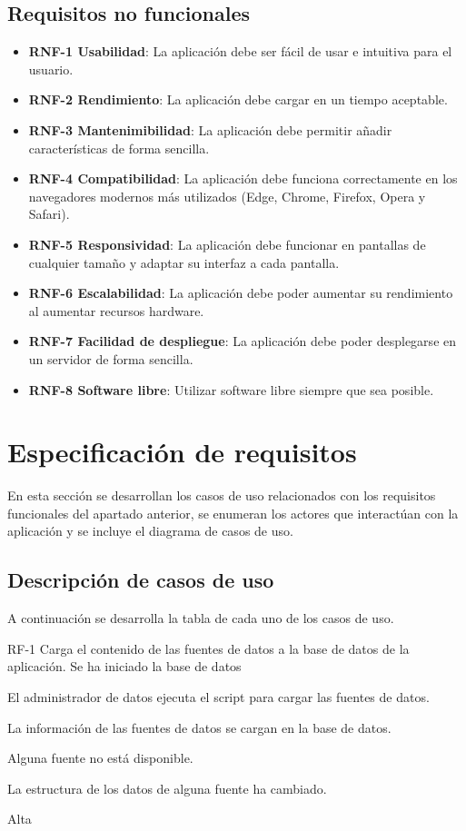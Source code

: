 \subsection{Requisitos no funcionales}

\begin{itemize}
	\item \textbf{RNF-1 Usabilidad}: La aplicación debe ser fácil de usar e intuitiva para el usuario.
	\item \textbf{RNF-2 Rendimiento}: La aplicación debe cargar en un tiempo aceptable.
	\item \textbf{RNF-3 Mantenimibilidad}: La aplicación debe permitir añadir características de forma sencilla.
	\item \textbf{RNF-4 Compatibilidad}: La aplicación debe funciona correctamente en los navegadores modernos más utilizados (Edge, Chrome, Firefox, Opera y Safari).
	\item \textbf{RNF-5 Responsividad}: La aplicación debe funcionar en pantallas de cualquier tamaño y adaptar su interfaz a cada pantalla.
	\item \textbf{RNF-6 Escalabilidad}: La aplicación debe poder aumentar su rendimiento al aumentar recursos hardware.
	\item \textbf{RNF-7 Facilidad de despliegue}: La aplicación debe poder desplegarse en un servidor de forma sencilla.
	\item \textbf{RNF-8 Software libre}: Utilizar software libre siempre que sea posible.
\end{itemize}

\section{Especificación de requisitos}

En esta sección se desarrollan los casos de uso relacionados con los requisitos funcionales del apartado anterior, se enumeran los actores que interactúan con la aplicación y se incluye el diagrama de casos de uso.

\subsection{Descripción de casos de uso}

A continuación se desarrolla la tabla de cada uno de los casos de uso.
\newpage


{RF-1}
{Carga el contenido de las fuentes de datos a la base de datos de la aplicación.}
{Se ha iniciado la base de datos}
{
	\item El administrador de datos ejecuta el script para cargar las fuentes de datos.
}
{La información de las fuentes de datos se cargan en la base de datos.}
{
	\item Alguna fuente no está disponible.
	\item La estructura de los datos de alguna fuente ha cambiado.
}
{Alta}

